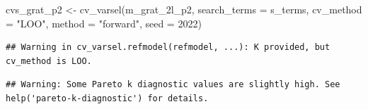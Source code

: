 \documentclass[
]{article}
\newenvironment{Shaded}{\begin{snugshade}}{\end{snugshade}}
\newcommand{\AttributeTok}[1]{\textcolor[rgb]{0.77,0.63,0.00}{#1}}
\newcommand{\DecValTok}[1]{\textcolor[rgb]{0.00,0.00,0.81}{#1}}
\newcommand{\FunctionTok}[1]{\textcolor[rgb]{0.00,0.00,0.00}{#1}}
\newcommand{\NormalTok}[1]{#1}
\newcommand{\OtherTok}[1]{\textcolor[rgb]{0.56,0.35,0.01}{#1}}
\newcommand{\StringTok}[1]{\textcolor[rgb]{0.31,0.60,0.02}{#1}}
\begin{document}
\begin{Shaded}
\begin{Highlighting}[]
\NormalTok{cvs\_grat\_p2 }\OtherTok{\textless{}{-}} \FunctionTok{cv\_varsel}\NormalTok{(m\_grat\_2l\_p2, }
                         \AttributeTok{search\_terms =}\NormalTok{ s\_terms, }
                         \AttributeTok{cv\_method =} \StringTok{"LOO"}\NormalTok{, }\AttributeTok{method =} \StringTok{"forward"}\NormalTok{, }
                         \AttributeTok{seed =} \DecValTok{2022}\NormalTok{)}
\end{Highlighting}
\end{Shaded}

\begin{verbatim}
## Warning in cv_varsel.refmodel(refmodel, ...): K provided, but cv_method is LOO.
\end{verbatim}

\begin{verbatim}
## Warning: Some Pareto k diagnostic values are slightly high. See help('pareto-k-diagnostic') for details.
\end{verbatim}
\end{document}

